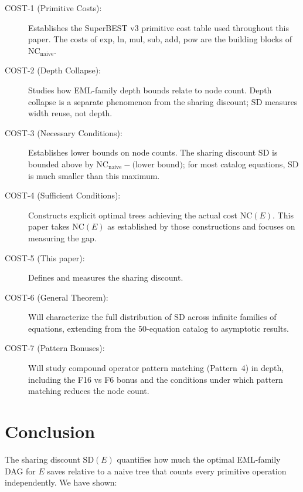 \documentclass[12pt,a4paper]{article}
\theoremstyle{definition}
\newcommand{\NC}{\mathrm{NC}}
\newcommand{\SD}{\mathrm{SD}}
\begin{document}
\begin{description}
  \item[COST-1 (Primitive Costs):] Establishes the SuperBEST v3 primitive
        cost table used throughout this paper.  The costs of exp, ln, mul,
        sub, add, pow are the building blocks of $\NC_{\mathrm{naive}}$.
  \item[COST-2 (Depth Collapse):] Studies how EML-family depth bounds
        relate to node count.  Depth collapse is a separate phenomenon
        from the sharing discount; $\SD$ measures width reuse, not depth.
  \item[COST-3 (Necessary Conditions):] Establishes lower bounds on node
        counts.  The sharing discount $\SD$ is bounded above by
        $\NC_{\mathrm{naive}} - \text{(lower bound)}$; for most catalog
        equations, $\SD$ is much smaller than this maximum.
  \item[COST-4 (Sufficient Conditions):] Constructs explicit optimal
        trees achieving the actual cost $\NC(E)$.  This paper takes $\NC(E)$
        as established by those constructions and focuses on measuring the gap.
  \item[COST-5 (This paper):] Defines and measures the sharing discount.
  \item[COST-6 (General Theorem):] Will characterize the full distribution
        of $\SD$ across infinite families of equations, extending from the
        50-equation catalog to asymptotic results.
  \item[COST-7 (Pattern Bonuses):] Will study compound operator pattern
        matching (Pattern~4) in depth, including the F16 vs F6 bonus and
        the conditions under which pattern matching reduces the node count.
\end{description}

\section*{Conclusion}

The sharing discount $\SD(E)$ quantifies how much the optimal EML-family
DAG for $E$ saves relative to a naive tree that counts every primitive
operation independently.  We have shown:
\end{document}
